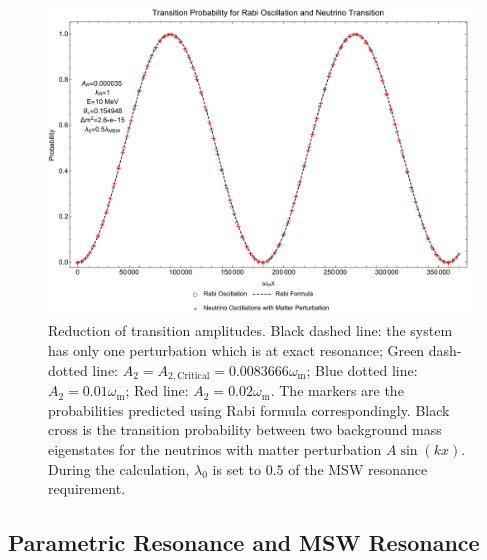 \documentclass[%
reprint,
 amsmath,amssymb,
 aps,
]{revtex4-1}
\begin{document}

\begin{figure}[!htbp]
                \centering
                \includegraphics[width=\columnwidth]{assets/rabiOscillationsNeutrinoCoincidence}
                \caption{Reduction of transition amplitudes. Black dashed line: the system has only one perturbation which is at exact resonance; Green dash-dotted line: $A_2=A_{2,\mathrm{Critical}}=0.0083666\omega_{\mathrm m}$; Blue dotted line: $A_2=0.01\omega_{\mathrm m}$; Red line: $A_2=0.02\omega_{\mathrm m}$. The markers are the probabilities predicted using Rabi formula correspondingly. Black cross is the transition probability between two background mass eigenstates for the neutrinos with matter perturbation $A\sin(kx)$. During the calculation, $\lambda_0$ is set to $0.5$ of the MSW resonance requirement.}
                \label{fig-rabiOscillationsNeutrinoCoincidence}
\end{figure}






\subsection{Parametric Resonance and MSW Resonance}
\end{document}
